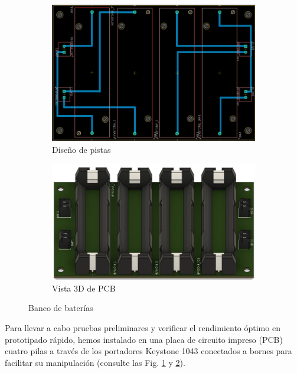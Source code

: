\begin{figure}
  \centering
  \begin{subfigure}{0.35\linewidth}
    \centering
    \includegraphics[width=\linewidth]{Pictures/DesignPCBHolders.png}
    \caption{Diseño de pistas}
    \label{fig:powerbankpistas}
  \end{subfigure}
  \begin{subfigure}{0.45\linewidth}
    \centering
    \includegraphics[width=\linewidth]{Pictures/DesignPCBHolders3d.png}
    \caption{Vista 3D de PCB}
    \label{fig:powerbankpistas3d}
  \end{subfigure}
  \caption{Banco de baterías}
  \label{fig:powerbank-subfiguras}
\end{figure}


Para llevar a cabo pruebas preliminares y verificar el rendimiento óptimo en prototipado rápido, hemos instalado en una placa de circuito impreso (PCB) cuatro pilas a través de los portadores Keystone 1043 conectados a bornes para facilitar su manipulación (consulte las Fig. \ref{fig:powerbankpistas} y \ref{fig:powerbankpistas3d}).


